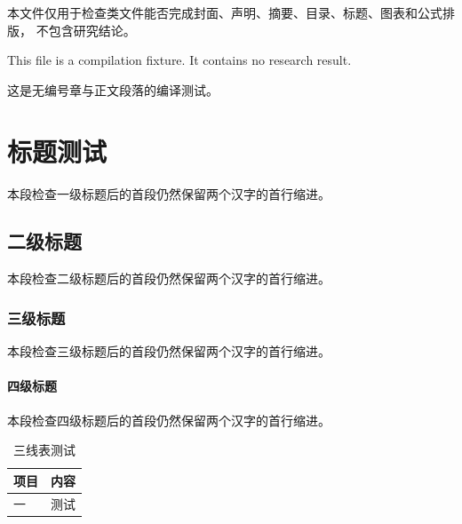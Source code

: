 \documentclass[humanities,nobibliography]{yibinthesis}
\makeatletter
\newcommand{\yibinassertheadingindent}[1]{%
  \if@afterindent\else
    \PackageError{yibinthesis-smoke}{#1 suppresses the following paragraph indent}{}
  \fi
  \ifdim\parindent=2em\relax\else
    \PackageError{yibinthesis-smoke}{#1 changed parindent from two em}{}
  \fi
}
\makeatother
\begin{document}
\makeyibincover
\makeyibindeclarations

\frontmatter
\begin{cnabstract}
本文件仅用于检查类文件能否完成封面、声明、摘要、目录、标题、图表和公式排版，
不包含研究结论。
\end{cnabstract}

\begin{enabstract}
This file is a compilation fixture. It contains no research result.
\end{enabstract}

\clearpage
\tableofcontents

\mainmatter
\yibinopeningchapter
\yibinassertheadingindent{Humanities opening chapter}
这是无编号章与正文段落的编译测试。

\chapter{标题测试}\label{chap:humanities-first}
\yibinassertheadingindent{Humanities chapter}
本段检查一级标题后的首段仍然保留两个汉字的首行缩进。

\section{二级标题}
\yibinassertheadingindent{Humanities section}
本段检查二级标题后的首段仍然保留两个汉字的首行缩进。

\subsection{三级标题}
\yibinassertheadingindent{Humanities subsection}
本段检查三级标题后的首段仍然保留两个汉字的首行缩进。

\subsubsection{四级标题}
\yibinassertheadingindent{Humanities subsubsection}
本段检查四级标题后的首段仍然保留两个汉字的首行缩进。

\begin{table}[htbp]
  \centering
  \caption{三线表测试}
  \label{tab:humanities}
  \begin{tabular}{ll}
    \toprule
    项目 & 内容 \\
    \midrule
    一 & 测试 \\
    \bottomrule
  \end{tabular}
\end{table}
\end{document}
